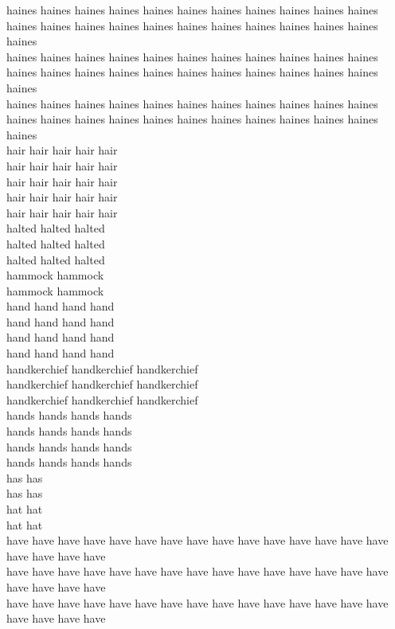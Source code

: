 haines haines haines haines haines haines haines haines haines haines haines haines haines haines haines haines haines haines haines haines haines haines haines\\
haines haines haines haines haines haines haines haines haines haines haines haines haines haines haines haines haines haines haines haines haines haines haines\\
haines haines haines haines haines haines haines haines haines haines haines haines haines haines haines haines haines haines haines haines haines haines haines\\
hair hair hair hair hair\\
hair hair hair hair hair\\
hair hair hair hair hair\\
hair hair hair hair hair\\
hair hair hair hair hair\\
halted halted halted\\
halted halted halted\\
halted halted halted\\
hammock hammock\\
hammock hammock\\
hand hand hand hand\\
hand hand hand hand\\
hand hand hand hand\\
hand hand hand hand\\
handkerchief handkerchief handkerchief\\
handkerchief handkerchief handkerchief\\
handkerchief handkerchief handkerchief\\
hands hands hands hands\\
hands hands hands hands\\
hands hands hands hands\\
hands hands hands hands\\
has has\\
has has\\
hat hat\\
hat hat\\
have have have have have have have have have have have have have have have have have have have\\
have have have have have have have have have have have have have have have have have have have\\
have have have have have have have have have have have have have have have have have have have\\
